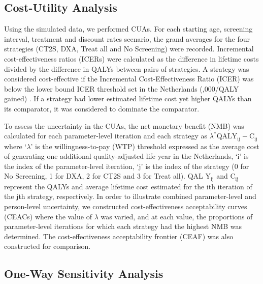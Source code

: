 \subsection{Cost-Utility Analysis}

Using the simulated data, we performed CUAs. For each starting age, screening interval, treatment and discount rates scenario, the grand averages for the four strategies (CT2S, DXA, Treat all and No Screening) were recorded. Incremental cost-effectiveness ratios (ICERs) were calculated as the difference in lifetime costs divided by the difference in QALYs between pairs of strategies. A strategy was considered cost-effective if the Incremental Cost-Effectiveness Ratio (ICER) was below the lower bound ICER threshold set in the Netherlands (,000/QALY gained) \cite{4-26}. If a strategy had lower estimated lifetime cost yet higher QALYs than its comparator, it was considered to dominate the comparator.

To assess the uncertainty in the CUAs, the net monetary benefit (NMB) was calculated for each parameter-level iteration and each strategy as $\lambda^* \mathrm{QAL} \mathrm{Y}_{\mathrm{ij}}-\mathrm{C}_{\mathrm{ij}}$ where `$\lambda$' is the willingness-to-pay (WTP) threshold expressed as the average cost of generating one additional quality-adjusted life year in the Netherlands, `i' is the index of the parameter-level iteration, `j' is the index of the strategy (0 for No Screening, 1 for DXA, 2 for CT2S and 3 for Treat all). QAL $\mathrm{Y}_{\mathrm{ij}}$ and $\mathrm{C}_{\mathrm{ij}}$ represent the QALYs and average lifetime cost estimated for the ith iteration of the jth strategy, respectively. In order to illustrate combined parameter-level and person-level uncertainty, we constructed cost-effectiveness acceptability curves (CEACs) where the value of $\lambda$ was varied, and at each value, the proportions of parameter-level iterations for which each strategy had the highest NMB was determined. The cost-effectiveness acceptability frontier (CEAF) was also constructed for comparison.

\subsection{One-Way Sensitivity Analysis}


